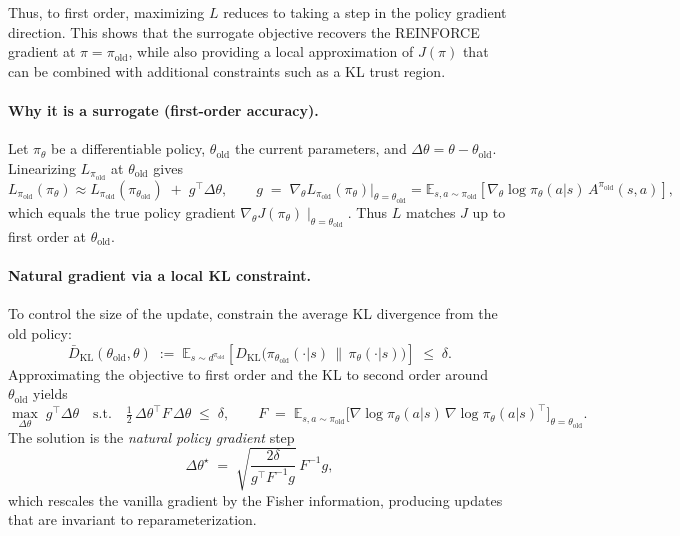 Thus, to first order, maximizing $L$ reduces to taking a step in the
policy gradient direction. This shows that the surrogate objective
recovers the REINFORCE gradient at $\pi = \pi_{\text{old}}$, while also
providing a local approximation of $J(\pi)$ that can be combined with
additional constraints such as a KL trust region.



\paragraph{Why it is a surrogate (first-order accuracy).}
Let $\pi_\theta$ be a differentiable policy, $\theta_{\text{old}}$ the current parameters, and $\Delta\theta=\theta-\theta_{\text{old}}$.
Linearizing $L_{\pi_{\text{old}}}$ at $\theta_{\text{old}}$ gives
\[
L_{\pi_{\text{old}}}(\pi_\theta) \approx L_{\pi_{\text{old}}}(\pi_{\theta_{\text{old}}})
\;+\; g^\top \Delta\theta,
\qquad
g \;=\; \nabla_\theta L_{\pi_{\text{old}}}(\pi_\theta)\big|_{\theta=\theta_{\text{old}}}
= \mathbb{E}_{s,a \sim \pi_{\text{old}}}
\!\left[ \nabla_\theta \log \pi_\theta(a|s)\, A^{\pi_{\text{old}}}(s,a) \right],
\]
which equals the true policy gradient $\nabla_\theta J(\pi_\theta)\!\mid_{\theta=\theta_{\text{old}}}$.
Thus $L$ matches $J$ up to first order at $\theta_{\text{old}}$.

\paragraph{Natural gradient via a local KL constraint.}
To control the size of the update, constrain the average KL divergence from the old policy:
\[
\bar{D}_{\mathrm{KL}}(\theta_{\text{old}},\theta)
\;:=\;
\mathbb{E}_{s \sim d^{\pi_{\text{old}}}}\!\left[
D_{\mathrm{KL}}\!\big(\pi_{\theta_{\text{old}}}(\cdot|s)\,\|\,\pi_{\theta}(\cdot|s)\big)
\right]
\;\le\; \delta.
\]
Approximating the objective to first order and the KL to second order around $\theta_{\text{old}}$ yields
\[
\max_{\Delta\theta}\; g^\top \Delta\theta
\quad \text{s.t.} \quad
\tfrac{1}{2}\,\Delta\theta^\top F\,\Delta\theta \;\le\; \delta,
\qquad
F \;=\; \mathbb{E}_{s,a \sim \pi_{\text{old}}}
\!\big[ \nabla \log \pi_{\theta}(a|s)\, \nabla \log \pi_{\theta}(a|s)^\top \big]_{\theta=\theta_{\text{old}}}.
\]
The solution is the \emph{natural policy gradient} step
\[
\Delta\theta^\star
\;=\;
\sqrt{\frac{2\delta}{g^\top F^{-1} g}}\, F^{-1} g,
\]
which rescales the vanilla gradient by the Fisher information, producing updates that are invariant to reparameterization.


